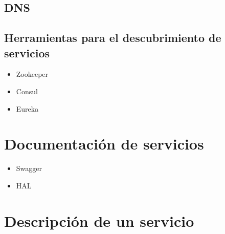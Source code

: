 \documentclass[11pt,a4paper]{article}
\begin{document}
\subsection{DNS}

\subsection{Herramientas para el descubrimiento de servicios}

\begin{itemize}
\item Zookeeper
\item Consul
\item Eureka
\end{itemize}

\section{Documentación de servicios}

\begin{itemize}
\item Swagger
\item HAL
\end{itemize}

\section{Descripción de un servicio}
\end{document}
